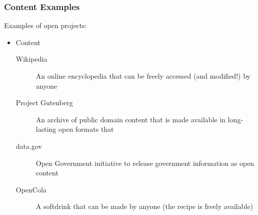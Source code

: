 \documentclass{beamer}
\begin{document}
\begin{frame}
  \frametitle{Content Examples}
  Examples of open projects:
  \begin{itemize}
  \item Content
    \begin{description}
    \item[Wikipedia] An online encyclopedia that can be freely accessed (and modified!) by anyone
    \item[Project Gutenberg] An archive of public domain content that is made available in long-lasting open formats that
    \item[data.gov] Open Government initiative to release government information as open content
    \item[OpenCola] A softdrink that can be made by anyone (the recipe
      is freely available)
    \end{description}
  \end{itemize}
\end{frame}
\end{document}
